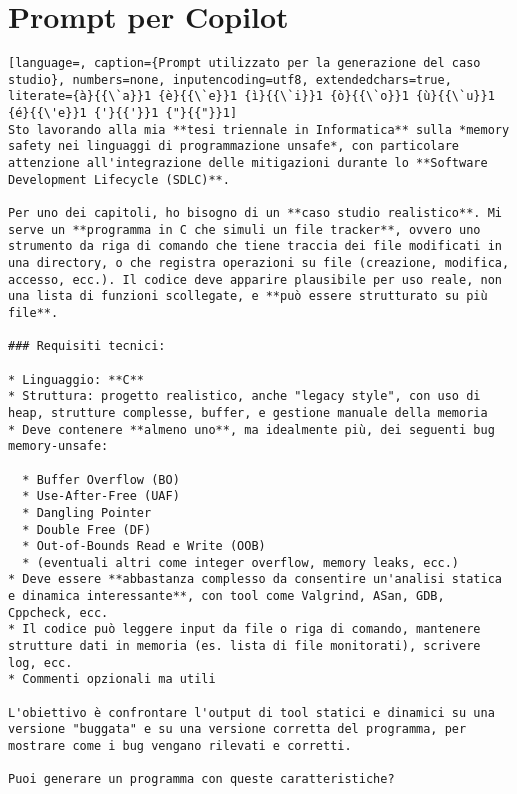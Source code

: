 \chapter{Prompt per Copilot}
\label{appendix:attachment}

\begin{lstlisting}[language=, caption={Prompt utilizzato per la generazione del caso studio}, numbers=none, inputencoding=utf8, extendedchars=true, literate={à}{{\`a}}1 {è}{{\`e}}1 {ì}{{\`i}}1 {ò}{{\`o}}1 {ù}{{\`u}}1 {é}{{\'e}}1 {'}{{'}}1 {"}{{"}}1]
Sto lavorando alla mia **tesi triennale in Informatica** sulla *memory safety nei linguaggi di programmazione unsafe*, con particolare attenzione all'integrazione delle mitigazioni durante lo **Software Development Lifecycle (SDLC)**.

Per uno dei capitoli, ho bisogno di un **caso studio realistico**. Mi serve un **programma in C che simuli un file tracker**, ovvero uno strumento da riga di comando che tiene traccia dei file modificati in una directory, o che registra operazioni su file (creazione, modifica, accesso, ecc.). Il codice deve apparire plausibile per uso reale, non una lista di funzioni scollegate, e **può essere strutturato su più file**.

### Requisiti tecnici:

* Linguaggio: **C**
* Struttura: progetto realistico, anche "legacy style", con uso di heap, strutture complesse, buffer, e gestione manuale della memoria
* Deve contenere **almeno uno**, ma idealmente più, dei seguenti bug memory-unsafe:

  * Buffer Overflow (BO)
  * Use-After-Free (UAF)
  * Dangling Pointer
  * Double Free (DF)
  * Out-of-Bounds Read e Write (OOB)
  * (eventuali altri come integer overflow, memory leaks, ecc.)
* Deve essere **abbastanza complesso da consentire un'analisi statica e dinamica interessante**, con tool come Valgrind, ASan, GDB, Cppcheck, ecc.
* Il codice può leggere input da file o riga di comando, mantenere strutture dati in memoria (es. lista di file monitorati), scrivere log, ecc.
* Commenti opzionali ma utili

L'obiettivo è confrontare l'output di tool statici e dinamici su una versione "buggata" e su una versione corretta del programma, per mostrare come i bug vengano rilevati e corretti.

Puoi generare un programma con queste caratteristiche?
\end{lstlisting}